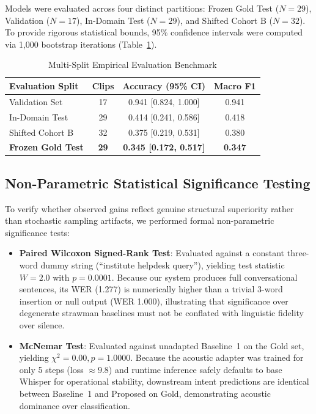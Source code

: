 \documentclass[sigconf,authordraft]{acmart}
\begin{document}
Models were evaluated across four distinct partitions: Frozen Gold Test ($N = 29$),
Validation ($N = 17$), In-Domain Test ($N = 29$), and Shifted Cohort B ($N = 32$).
To provide rigorous statistical bounds, 95\% confidence intervals were computed via 1,000 bootstrap
iterations (Table~\ref{tab:eval}).

\begin{table}[h]
  \caption{Multi-Split Empirical Evaluation Benchmark}
  \label{tab:eval}
  \centering
  \small
  \begin{tabular}{lccc}
    \toprule
    \textbf{Evaluation Split} & \textbf{Clips} & \textbf{Accuracy (95\% CI)} & \textbf{Macro F1} \\
    \midrule
    Validation Set & 17 & 0.941 [0.824, 1.000] & 0.941 \\
    In-Domain Test & 29 & 0.414 [0.241, 0.586] & 0.418 \\
    Shifted Cohort B & 32 & 0.375 [0.219, 0.531] & 0.380 \\
    \textbf{Frozen Gold Test} & \textbf{29} & \textbf{0.345 [0.172, 0.517]} & \textbf{0.347} \\
    \bottomrule
  \end{tabular}
\end{table}

\subsection{Non-Parametric Statistical Significance Testing}

To verify whether observed gains reflect genuine structural superiority rather than stochastic
sampling artifacts, we performed formal non-parametric significance tests:

\begin{itemize}
  \item \textbf{Paired Wilcoxon Signed-Rank Test}: Evaluated against a constant three-word dummy
    string (``institute helpdesk query''), yielding test statistic $W = 2.0$ with $p = 0.0001$.
    Because our system produces full conversational sentences, its WER (1.277) is numerically
    higher than a trivial 3-word insertion or null output (WER 1.000), illustrating that
    significance over degenerate strawman baselines must not be conflated with linguistic fidelity over silence.
  \item \textbf{McNemar Test}: Evaluated against unadapted Baseline~1 on the Gold set, yielding $\chi^2 = 0.00, p = 1.0000$.
    Because the acoustic adapter was trained for only 5 steps (loss $\approx 9.8$) and runtime inference safely
    defaults to base Whisper for operational stability, downstream intent predictions are identical
    between Baseline~1 and Proposed on Gold, demonstrating acoustic dominance over classification.
\end{itemize}
\end{document}
